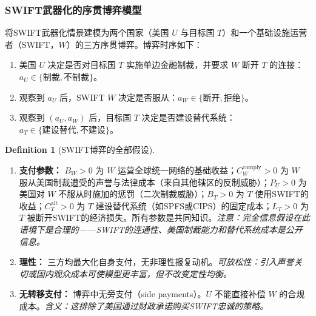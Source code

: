 \documentclass[12pt,a4paper]{ctexart}
\theoremstyle{definition}
\newtheorem{definition}{Definition}[section]
\theoremstyle{remark}
\begin{document}
\subsubsection{SWIFT武器化的序贯博弈模型}

将SWIFT武器化情景建模为两个国家（美国 $U$ 与目标国 $T$）和一个基础设施运营者（SWIFT，$W$）的三方序贯博弈。博弈时序如下：

\begin{enumerate}[label=阶段 \arabic*:, leftmargin=*]
\item 美国 $U$ 决定是否对目标国 $T$ 实施单边金融制裁，并要求 $W$ 断开 $T$ 的连接：$a_U \in \{\text{制裁}, \text{不制裁}\}$。
\item 观察到 $a_U$ 后，SWIFT $W$ 决定是否服从：$a_W \in \{\text{断开}, \text{拒绝}\}$。
\item 观察到 $(a_U, a_W)$ 后，目标国 $T$ 决定是否建设替代系统：$a_T \in \{\text{建设替代}, \text{不建设}\}$。
\end{enumerate}

\begin{definition}[SWIFT博弈的全部假设]
\label{def:swift-assumptions}
\begin{enumerate}[label=\textbf{S\arabic*}, leftmargin=*, itemsep=4pt]
\item \textbf{支付参数：} $B_W > 0$ 为 $W$ 运营全球统一网络的基础收益；$C_W^{\text{comply}} > 0$ 为 $W$ 服从美国制裁遭受的声誉与法律成本（来自其他辖区的反制威胁）；$P_U > 0$ 为美国对 $W$ 不服从时施加的惩罚（二次制裁威胁）；$B_T > 0$ 为 $T$ 使用SWIFT的收益；$C_T^{\text{alt}} > 0$ 为 $T$ 建设替代系统（如SPFS或CIPS）的固定成本；$L_T > 0$ 为 $T$ 被断开SWIFT的经济损失。所有参数是共同知识。\hfill\textit{注意：完全信息假设在此语境下是合理的——SWIFT的连通性、美国制裁能力和替代系统成本是公开信息。}

\item \textbf{理性：} 三方均最大化自身支付，无非理性报复动机。\hfill\textit{可放松性：引入声誉关切或国内观众成本可使模型更丰富，但不改变定性均衡。}

\item \textbf{无转移支付：} 博弈中无旁支付（side payments）。$U$ 不能直接补偿 $W$ 的合规成本。\hfill\textit{含义：这排除了美国通过财政承诺购买SWIFT忠诚的策略。}
\end{enumerate}
\end{definition}
\end{document}
